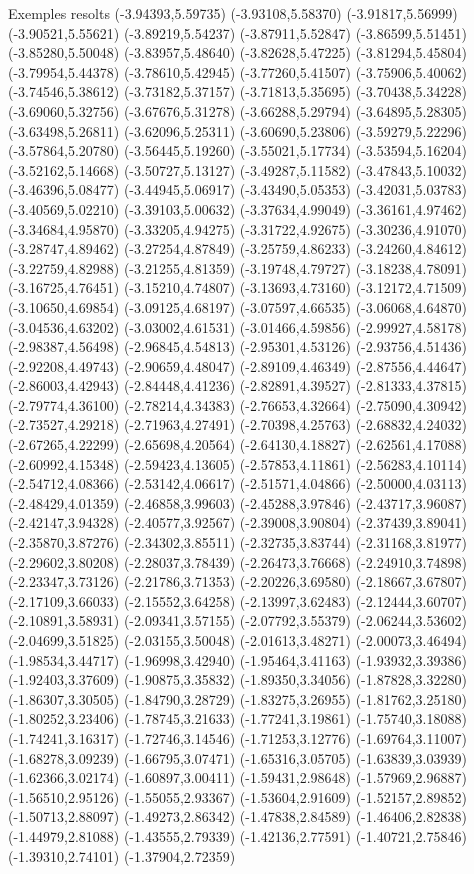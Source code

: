 \documentclass[11pt,a4paper]{article}
\begin{document}
\begin{fmex}{Exemples resolts}
(-3.94393,5.59735) (-3.93108,5.58370) (-3.91817,5.56999) (-3.90521,5.55621) (-3.89219,5.54237) (-3.87911,5.52847) (-3.86599,5.51451) (-3.85280,5.50048) (-3.83957,5.48640) (-3.82628,5.47225) (-3.81294,5.45804) (-3.79954,5.44378) (-3.78610,5.42945) (-3.77260,5.41507) (-3.75906,5.40062) (-3.74546,5.38612) (-3.73182,5.37157) (-3.71813,5.35695) (-3.70438,5.34228) (-3.69060,5.32756) (-3.67676,5.31278) (-3.66288,5.29794) (-3.64895,5.28305) (-3.63498,5.26811) (-3.62096,5.25311) (-3.60690,5.23806) (-3.59279,5.22296) (-3.57864,5.20780) (-3.56445,5.19260) (-3.55021,5.17734) (-3.53594,5.16204) (-3.52162,5.14668) (-3.50727,5.13127) (-3.49287,5.11582) (-3.47843,5.10032) (-3.46396,5.08477) (-3.44945,5.06917) (-3.43490,5.05353) (-3.42031,5.03783) (-3.40569,5.02210) (-3.39103,5.00632) (-3.37634,4.99049) (-3.36161,4.97462) (-3.34684,4.95870) (-3.33205,4.94275) (-3.31722,4.92675) (-3.30236,4.91070) (-3.28747,4.89462) (-3.27254,4.87849) (-3.25759,4.86233) (-3.24260,4.84612) (-3.22759,4.82988) (-3.21255,4.81359) (-3.19748,4.79727) (-3.18238,4.78091) (-3.16725,4.76451) (-3.15210,4.74807) (-3.13693,4.73160) (-3.12172,4.71509) (-3.10650,4.69854) (-3.09125,4.68197) (-3.07597,4.66535) (-3.06068,4.64870) (-3.04536,4.63202) (-3.03002,4.61531) (-3.01466,4.59856) (-2.99927,4.58178) (-2.98387,4.56498) (-2.96845,4.54813) (-2.95301,4.53126) (-2.93756,4.51436) (-2.92208,4.49743) (-2.90659,4.48047) (-2.89109,4.46349) (-2.87556,4.44647) (-2.86003,4.42943) (-2.84448,4.41236) (-2.82891,4.39527) (-2.81333,4.37815) (-2.79774,4.36100) (-2.78214,4.34383) (-2.76653,4.32664) (-2.75090,4.30942) (-2.73527,4.29218) (-2.71963,4.27491) (-2.70398,4.25763) (-2.68832,4.24032) (-2.67265,4.22299) (-2.65698,4.20564) (-2.64130,4.18827) (-2.62561,4.17088) (-2.60992,4.15348) (-2.59423,4.13605) (-2.57853,4.11861) (-2.56283,4.10114) (-2.54712,4.08366) (-2.53142,4.06617) (-2.51571,4.04866) (-2.50000,4.03113) (-2.48429,4.01359) (-2.46858,3.99603) (-2.45288,3.97846) (-2.43717,3.96087) (-2.42147,3.94328) (-2.40577,3.92567) (-2.39008,3.90804) (-2.37439,3.89041) (-2.35870,3.87276) (-2.34302,3.85511) (-2.32735,3.83744) (-2.31168,3.81977) (-2.29602,3.80208) (-2.28037,3.78439) (-2.26473,3.76668) (-2.24910,3.74898) (-2.23347,3.73126) (-2.21786,3.71353) (-2.20226,3.69580) (-2.18667,3.67807) (-2.17109,3.66033) (-2.15552,3.64258) (-2.13997,3.62483) (-2.12444,3.60707) (-2.10891,3.58931) (-2.09341,3.57155) (-2.07792,3.55379) (-2.06244,3.53602) (-2.04699,3.51825) (-2.03155,3.50048) (-2.01613,3.48271) (-2.00073,3.46494) (-1.98534,3.44717) (-1.96998,3.42940) (-1.95464,3.41163) (-1.93932,3.39386) (-1.92403,3.37609) (-1.90875,3.35832) (-1.89350,3.34056) (-1.87828,3.32280) (-1.86307,3.30505) (-1.84790,3.28729) (-1.83275,3.26955) (-1.81762,3.25180) (-1.80252,3.23406) (-1.78745,3.21633) (-1.77241,3.19861) (-1.75740,3.18088) (-1.74241,3.16317) (-1.72746,3.14546) (-1.71253,3.12776) (-1.69764,3.11007) (-1.68278,3.09239) (-1.66795,3.07471) (-1.65316,3.05705) (-1.63839,3.03939) (-1.62366,3.02174) (-1.60897,3.00411) (-1.59431,2.98648) (-1.57969,2.96887) (-1.56510,2.95126) (-1.55055,2.93367) (-1.53604,2.91609) (-1.52157,2.89852) (-1.50713,2.88097) (-1.49273,2.86342) (-1.47838,2.84589) (-1.46406,2.82838) (-1.44979,2.81088) (-1.43555,2.79339) (-1.42136,2.77591) (-1.40721,2.75846) (-1.39310,2.74101) (-1.37904,2.72359) 
\end{fmex}
\end{document}
